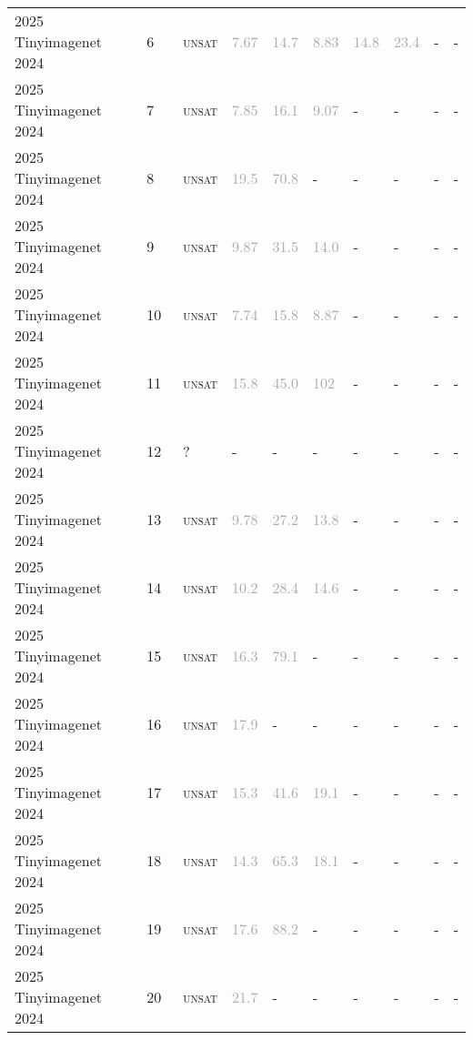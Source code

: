 \begin{center}
{\begin{longtable}{@{}llllllllll@{}}
2025 Tinyimagenet 2024 & 6 & ~\textsc{unsat} & \textcolor{darkgray}{7.67} & \textcolor{darkgray}{14.7} & \textcolor{darkgray}{8.83} & \textcolor{darkgray}{14.8} & \textcolor{darkgray}{23.4} & - & - \\
2025 Tinyimagenet 2024 & 7 & ~\textsc{unsat} & \textcolor{darkgray}{7.85} & \textcolor{darkgray}{16.1} & \textcolor{darkgray}{9.07} & - & - & - & - \\
2025 Tinyimagenet 2024 & 8 & ~\textsc{unsat} & \textcolor{darkgray}{19.5} & \textcolor{darkgray}{70.8} & - & - & - & - & - \\
2025 Tinyimagenet 2024 & 9 & ~\textsc{unsat} & \textcolor{darkgray}{9.87} & \textcolor{darkgray}{31.5} & \textcolor{darkgray}{14.0} & - & - & - & - \\
2025 Tinyimagenet 2024 & 10 & ~\textsc{unsat} & \textcolor{darkgray}{7.74} & \textcolor{darkgray}{15.8} & \textcolor{darkgray}{8.87} & - & - & - & - \\
2025 Tinyimagenet 2024 & 11 & ~\textsc{unsat} & \textcolor{darkgray}{15.8} & \textcolor{darkgray}{45.0} & \textcolor{darkgray}{102} & - & - & - & - \\
2025 Tinyimagenet 2024 & 12 & ~? & - & - & - & - & - & - & - \\
2025 Tinyimagenet 2024 & 13 & ~\textsc{unsat} & \textcolor{darkgray}{9.78} & \textcolor{darkgray}{27.2} & \textcolor{darkgray}{13.8} & - & - & - & - \\
2025 Tinyimagenet 2024 & 14 & ~\textsc{unsat} & \textcolor{darkgray}{10.2} & \textcolor{darkgray}{28.4} & \textcolor{darkgray}{14.6} & - & - & - & - \\
2025 Tinyimagenet 2024 & 15 & ~\textsc{unsat} & \textcolor{darkgray}{16.3} & \textcolor{darkgray}{79.1} & - & - & - & - & - \\
2025 Tinyimagenet 2024 & 16 & ~\textsc{unsat} & \textcolor{darkgray}{17.9} & - & - & - & - & - & - \\
2025 Tinyimagenet 2024 & 17 & ~\textsc{unsat} & \textcolor{darkgray}{15.3} & \textcolor{darkgray}{41.6} & \textcolor{darkgray}{19.1} & - & - & - & - \\
2025 Tinyimagenet 2024 & 18 & ~\textsc{unsat} & \textcolor{darkgray}{14.3} & \textcolor{darkgray}{65.3} & \textcolor{darkgray}{18.1} & - & - & - & - \\
2025 Tinyimagenet 2024 & 19 & ~\textsc{unsat} & \textcolor{darkgray}{17.6} & \textcolor{darkgray}{88.2} & - & - & - & - & - \\
2025 Tinyimagenet 2024 & 20 & ~\textsc{unsat} & \textcolor{darkgray}{21.7} & - & - & - & - & - & - \\

\end{longtable}}
\end{center}
